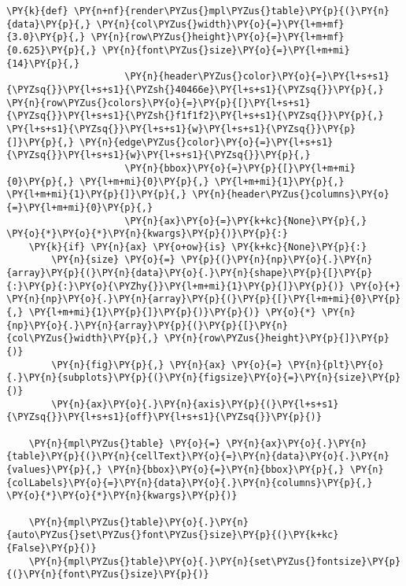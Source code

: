     \begin{tcolorbox}[breakable, size=fbox, boxrule=1pt, pad at break*=1mm,colback=cellbackground, colframe=cellborder]
\begin{Verbatim}[commandchars=\\\{\}]
\PY{k}{def} \PY{n+nf}{render\PYZus{}mpl\PYZus{}table}\PY{p}{(}\PY{n}{data}\PY{p}{,} \PY{n}{col\PYZus{}width}\PY{o}{=}\PY{l+m+mf}{3.0}\PY{p}{,} \PY{n}{row\PYZus{}height}\PY{o}{=}\PY{l+m+mf}{0.625}\PY{p}{,} \PY{n}{font\PYZus{}size}\PY{o}{=}\PY{l+m+mi}{14}\PY{p}{,}
                     \PY{n}{header\PYZus{}color}\PY{o}{=}\PY{l+s+s1}{\PYZsq{}}\PY{l+s+s1}{\PYZsh{}40466e}\PY{l+s+s1}{\PYZsq{}}\PY{p}{,} \PY{n}{row\PYZus{}colors}\PY{o}{=}\PY{p}{[}\PY{l+s+s1}{\PYZsq{}}\PY{l+s+s1}{\PYZsh{}f1f1f2}\PY{l+s+s1}{\PYZsq{}}\PY{p}{,} \PY{l+s+s1}{\PYZsq{}}\PY{l+s+s1}{w}\PY{l+s+s1}{\PYZsq{}}\PY{p}{]}\PY{p}{,} \PY{n}{edge\PYZus{}color}\PY{o}{=}\PY{l+s+s1}{\PYZsq{}}\PY{l+s+s1}{w}\PY{l+s+s1}{\PYZsq{}}\PY{p}{,}
                     \PY{n}{bbox}\PY{o}{=}\PY{p}{[}\PY{l+m+mi}{0}\PY{p}{,} \PY{l+m+mi}{0}\PY{p}{,} \PY{l+m+mi}{1}\PY{p}{,} \PY{l+m+mi}{1}\PY{p}{]}\PY{p}{,} \PY{n}{header\PYZus{}columns}\PY{o}{=}\PY{l+m+mi}{0}\PY{p}{,}
                     \PY{n}{ax}\PY{o}{=}\PY{k+kc}{None}\PY{p}{,} \PY{o}{*}\PY{o}{*}\PY{n}{kwargs}\PY{p}{)}\PY{p}{:}
    \PY{k}{if} \PY{n}{ax} \PY{o+ow}{is} \PY{k+kc}{None}\PY{p}{:}
        \PY{n}{size} \PY{o}{=} \PY{p}{(}\PY{n}{np}\PY{o}{.}\PY{n}{array}\PY{p}{(}\PY{n}{data}\PY{o}{.}\PY{n}{shape}\PY{p}{[}\PY{p}{:}\PY{p}{:}\PY{o}{\PYZhy{}}\PY{l+m+mi}{1}\PY{p}{]}\PY{p}{)} \PY{o}{+} \PY{n}{np}\PY{o}{.}\PY{n}{array}\PY{p}{(}\PY{p}{[}\PY{l+m+mi}{0}\PY{p}{,} \PY{l+m+mi}{1}\PY{p}{]}\PY{p}{)}\PY{p}{)} \PY{o}{*} \PY{n}{np}\PY{o}{.}\PY{n}{array}\PY{p}{(}\PY{p}{[}\PY{n}{col\PYZus{}width}\PY{p}{,} \PY{n}{row\PYZus{}height}\PY{p}{]}\PY{p}{)}
        \PY{n}{fig}\PY{p}{,} \PY{n}{ax} \PY{o}{=} \PY{n}{plt}\PY{o}{.}\PY{n}{subplots}\PY{p}{(}\PY{n}{figsize}\PY{o}{=}\PY{n}{size}\PY{p}{)}
        \PY{n}{ax}\PY{o}{.}\PY{n}{axis}\PY{p}{(}\PY{l+s+s1}{\PYZsq{}}\PY{l+s+s1}{off}\PY{l+s+s1}{\PYZsq{}}\PY{p}{)}

    \PY{n}{mpl\PYZus{}table} \PY{o}{=} \PY{n}{ax}\PY{o}{.}\PY{n}{table}\PY{p}{(}\PY{n}{cellText}\PY{o}{=}\PY{n}{data}\PY{o}{.}\PY{n}{values}\PY{p}{,} \PY{n}{bbox}\PY{o}{=}\PY{n}{bbox}\PY{p}{,} \PY{n}{colLabels}\PY{o}{=}\PY{n}{data}\PY{o}{.}\PY{n}{columns}\PY{p}{,} \PY{o}{*}\PY{o}{*}\PY{n}{kwargs}\PY{p}{)}

    \PY{n}{mpl\PYZus{}table}\PY{o}{.}\PY{n}{auto\PYZus{}set\PYZus{}font\PYZus{}size}\PY{p}{(}\PY{k+kc}{False}\PY{p}{)}
    \PY{n}{mpl\PYZus{}table}\PY{o}{.}\PY{n}{set\PYZus{}fontsize}\PY{p}{(}\PY{n}{font\PYZus{}size}\PY{p}{)}


\end{Verbatim}
\end{tcolorbox}
